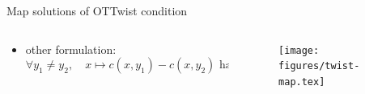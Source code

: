\documentclass[9pt,xcolor={dvipsnames}]{beamer}
\begin{document}
\begin{frame}{Map solutions of OT}{Twist condition}
\begin{columns}
\begin{column}{.7\textwidth}
{\begin{itemize}
\begin{table}[h]
                \end{table}
                \item other formulation:
                \begin{equation*}
                    \forall y_1\neq y_2,\quad x\mapsto c(x,y_1)-c(x,y_2) \text{ has no critical point.}
                \end{equation*}
            \end{itemize}}
        \end{column}
        \begin{column}{.3\textwidth}
            \begin{figure}
                \texttt{[image: figures/twist-map.tex]}
            \end{figure}
        \end{column}
    \end{columns}
\end{frame}
\end{document}
